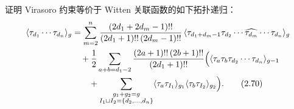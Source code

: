 \begin{exercise}[2.11]
证明 Virasoro 约束等价于 Witten 关联函数的如下拓扑递归：
\begin{align}
\langle\tau_{d_1}\cdots\tau_{d_n}\rangle_g
&= \sum_{m=2}^{n}\frac{(2d_1+2d_m-1)!!}{(2d_1+1)!!\,(2d_m-1)!!}\,
\langle\tau_{d_1+d_m-1}\tau_{d_2}\cdots\widehat{\tau_{d_m}}\cdots\tau_{d_n}\rangle_g \nonumber\\
&\quad+\frac{1}{2}\sum_{a+b=d_1-2}\frac{(2a+1)!!\,(2b+1)!!}{(2d_1+1)!!}
\Bigl(\langle\tau_a\tau_b\tau_{d_2}\cdots\tau_{d_n}\rangle_{g-1} \nonumber\\
&\qquad+\sum_{\substack{g_1+g_2=g\\ I_1\sqcup I_2=\{d_2,\ldots,d_n\}}}
\langle\tau_a\tau_{I_1}\rangle_{g_1}\langle\tau_b\tau_{I_2}\rangle_{g_2}\Bigr). \tag{2.70}
\end{align}


\end{exercise}
